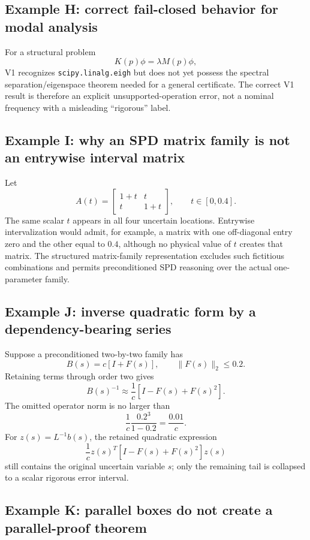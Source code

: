 \documentclass[11pt]{article}
\begin{document}
\subsection{Example H: correct fail-closed behavior for modal analysis}

For a structural problem
\[
  K(p)\phi=\lambda M(p)\phi,
\]
V1 recognizes \texttt{scipy.linalg.eigh} but does not yet possess the spectral
separation/eigenspace theorem needed for a general certificate.  The correct
V1 result is therefore an explicit unsupported-operation error, not a nominal
frequency with a misleading ``rigorous'' label.


\subsection{Example I: why an SPD matrix family is not an entrywise interval matrix}

Let
\[
  A(t)=\begin{bmatrix}1+t&t\\t&1+t\end{bmatrix},
  \qquad t\in[0,0.4].
\]
The same scalar \(t\) appears in all four uncertain locations.  Entrywise
intervalization would admit, for example, a matrix with one off-diagonal entry
zero and the other equal to \(0.4\), although no physical value of \(t\) creates
that matrix.  The structured matrix-family representation excludes such fictitious
combinations and permits preconditioned SPD reasoning over the actual one-parameter
family.

\subsection{Example J: inverse quadratic form by a dependency-bearing series}

Suppose a preconditioned two-by-two family has
\[
  B(s)=c[I+F(s)],\qquad \|F(s)\|_2\le0.2.
\]
Retaining terms through order two gives
\[
  B(s)^{-1}\approx\frac1c[I-F(s)+F(s)^2].
\]
The omitted operator norm is no larger than
\[
  \frac1c\frac{0.2^3}{1-0.2}=\frac{0.01}{c}.
\]
For \(z(s)=L^{-1}b(s)\), the retained quadratic expression
\[
  \frac1c z(s)^T[I-F(s)+F(s)^2]z(s)
\]
still contains the original uncertain variable \(s\); only the remaining tail is
collapsed to a scalar rigorous error interval.

\subsection{Example K: parallel boxes do not create a parallel-proof theorem}
\end{document}
